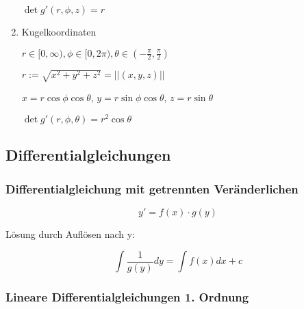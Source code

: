 \documentclass[twoside]{article}
\begin{document}
\begin{enumerate}[1.]
						\begin{math} \det g'(r, \phi, z) = r \end{math}
					
					\item Kugelkoordinaten
					
						\begin{math} r \in [0, \infty), \phi \in [0, 2\pi), \theta \in (- \frac{\pi}{2}, \frac{\pi}{2}) \end{math}
					
						\begin{math} r := \sqrt{x^2 + y^2 + z^2} = ||(x,y,z)|| \end{math}
					
						\begin{math} x = r \cos \phi \cos \theta \end{math},
						\begin{math} y = r \sin \phi \cos \theta \end{math},
						\begin{math} z = r \sin \theta \end{math}
						
						\begin{math} \det g'(r, \phi, \theta) = r^2 \cos \theta \end{math}
				\end{enumerate}
	
		\subsection{Differentialgleichungen}
	
			\subsubsection{Differentialgleichung mit getrennten Veränderlichen}
			
				\begin{displaymath}
					y' = f(x) \cdot g(y)
				\end{displaymath}
		
				Lösung durch Auflösen nach y:
		
				\begin{displaymath}
					\int \frac{1}{g(y)} dy = \int f(x) dx +c
				\end{displaymath}
		
			\subsubsection{Lineare Differentialgleichungen 1. Ordnung}
				
\end{document}
